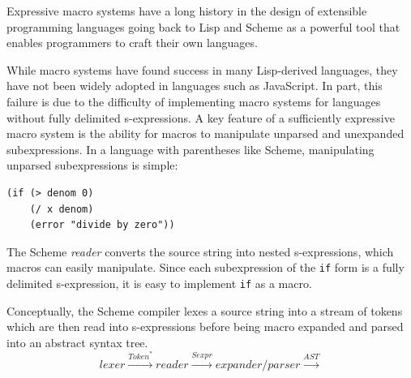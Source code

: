 \documentclass[9pt]{sigplanconf}
\begin{document}
Expressive macro systems have a long history in the design of
extensible programming languages going back to Lisp and Scheme
\cite{Kohlbecker1987,Foderaro1983} as a powerful tool that enables
programmers to craft their own languages.

While macro systems have found success in many Lisp-derived languages,
they have not been widely adopted in languages such as JavaScript. In
part, this failure is due to the difficulty of implementing macro
systems for languages without fully delimited s-expressions. A key
feature of a sufficiently expressive macro system is the ability for
macros to manipulate unparsed and unexpanded subexpressions. In a
language with parentheses like Scheme, manipulating unparsed
subexpressions is simple:
\begin{lstlisting}
(if (> denom 0)
    (/ x denom)
    (error "divide by zero"))
\end{lstlisting}
The Scheme \emph{reader} converts the source string into nested
s-expressions, which macros can easily manipulate. Since each
subexpression of the \verb!if! form is a fully delimited
s-expression, it is easy to implement \verb!if! as a
macro.


Conceptually, the Scheme compiler lexes a source string into
a stream of tokens which are then read into s-expressions
before being macro expanded and parsed into an abstract syntax tree.
\[
\textit{lexer} \xrightarrow{\textit{Token}^{*}}
\textit{reader} \xrightarrow{\textit{Sexpr}}
\textit{expander/parser} \xrightarrow{\textit{AST}}
\]
\end{document}
